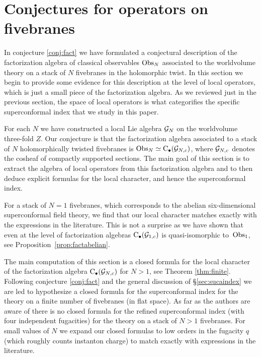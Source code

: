 \section{Conjectures for operators on fivebranes}

In conjecture \ref{conj:fact} we have formulated a conjectural description of the factorization algebra of classical observables $\operatorname{Obs}_{N}$ associated to the worldvolume theory on a stack of $N$ fivebranes in the holomorphic twist.
In this section we begin to provide some evidence for this description at the level of local operators, which is just a small piece of the factorization algebra.
As we reviewed just in the previous section, the space of local operators is what categorifies the specific superconformal index that we study in this paper.

For each $N$ we have constructed a local Lie algebra $\mathcal G_N$ on the worldvolume three-fold $Z$. 
Our conjecture is that the factorization algebra associated to a stack of $N$ holomorphically twisted fivebranes is $\operatorname{Obs}_N \simeq {\rm C}_\bullet(\mathcal G_{N,c})$, where $\mathcal G_{N,c}$ denotes the cosheaf of compactly supported sections. 
The main goal of this section is to extract the algebra of local operators from this factorization algebra and to then deduce explicit formulas for the local character, and hence the superconformal index.

For a stack of $N=1$ fivebranes, which corresponds to the abelian six-dimensional superconformal field theory, we find that our local character matches exactly with the expressions in the literature. 
This is not a surprise as we have shown that even at the level of factorization algebras ${\rm C}_\bullet(\mathcal G_{1,c})$ is quasi-isomorphic to~$\operatorname{Obs}_1$, see Proposition~\ref{prop:factabelian}.

The main computation of this section is a closed formula for the local character of the factorization algebra ${\rm C}_\bullet(\mathcal G_{N,c})$ for $N > 1$, see Theorem \ref{thm:finite}. 
Following conjecture \ref{conj:fact} and the general discussion of \S \ref{sec:sucaindex} we are led to hypothesize a closed formula for the superconformal index for the theory on a finite number of fivebranes (in flat space).
As far as the authors are aware of there is no closed formula for the refined superconformal index (with four independent fugacities) for the theory on a stack of $N > 1$ fivebranes.
For small values of $N$ we expand our closed formulas to low orders in the fugacity $q$ (which roughly counts instanton charge) to match exactly with expressions in the literature. 

